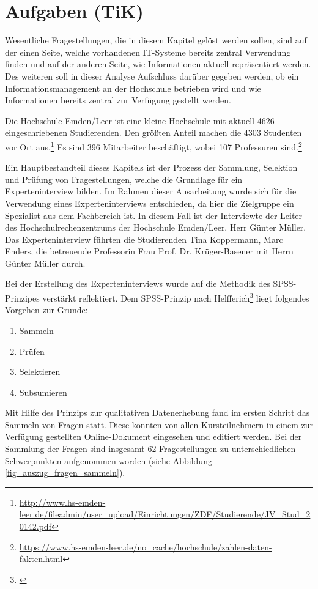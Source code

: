 \section{Aufgaben (TiK)}
Wesentliche Fragestellungen, die in diesem Kapitel gelöst werden sollen, sind auf der einen Seite, welche vorhandenen IT-Systeme bereits zentral Verwendung finden und auf der anderen Seite, wie Informationen aktuell repräsentiert werden. Des weiteren soll in dieser Analyse Aufschluss darüber gegeben werden, ob ein Informationsmanagement an der Hochschule betrieben wird und wie Informationen bereits zentral zur Verfügung gestellt werden.

Die Hochschule Emden/Leer ist eine kleine Hochschule mit aktuell 4626 eingeschriebenen Studierenden. Den größten Anteil machen die 4303 Studenten vor Ort aus.\footnote{\url{http://www.hs-emden-leer.de/fileadmin/user_upload/Einrichtungen/ZDF/Studierende/JV_Stud_20142.pdf}} Es sind 396 Mitarbeiter beschäftigt, wobei 107 Professuren sind.\footnote{\url{https://www.hs-emden-leer.de/no_cache/hochschule/zahlen-daten-fakten.html}}

Ein Hauptbestandteil dieses Kapitels ist der Prozess der Sammlung, Selektion und Prüfung von Fragestellungen, welche die Grundlage für ein Experteninterview bilden. Im Rahmen dieser Ausarbeitung wurde sich für die Verwendung eines Experteninterviews entschieden, da hier die Zielgruppe ein Spezialist aus dem Fachbereich ist. In diesem Fall ist der Interviewte der Leiter des Hochschulrechenzentrums der Hochschule Emden/Leer, Herr Günter Müller. Das Experteninterview führten die Studierenden Tina Koppermann, Marc Enders, die betreuende Professorin Frau Prof. Dr. Krüger-Basener mit Herrn Günter Müller durch. 

Bei der Erstellung des Experteninterviews wurde auf die Methodik des SPSS-Prinzipes verstärkt reflektiert. Dem SPSS-Prinzip nach Helfferich\footnote{\cite{helfferich_2009}} liegt folgendes Vorgehen zur Grunde:

\begin{enumerate}
	\item Sammeln
	\item Prüfen
	\item Selektieren
	\item Subsumieren		
\end{enumerate}

Mit Hilfe des Prinzips zur qualitativen Datenerhebung fand im ersten Schritt das Sammeln von Fragen statt. Diese konnten von allen Kursteilnehmern in einem zur Verfügung gestellten Online-Dokument eingesehen und editiert werden. Bei der Sammlung der Fragen sind insgesamt 62 Fragestellungen zu unterschiedlichen Schwerpunkten aufgenommen worden (siehe Abbildung \ref{fig_auszug_fragen_sammeln}).

